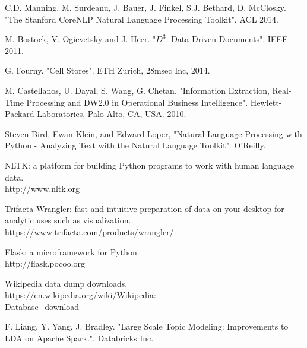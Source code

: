 \documentclass[10pt, a4paper, twocolumn]{article} %
\begin{document}
\begin{thebibliography}{99}
 C.D. Manning, M. Surdeanu, J. Bauer, J. Finkel, S.J. Bethard, D. McClosky. "The Stanford CoreNLP Natural Language Processing Toolkit". ACL 2014.

 M. Bostock, V. Ogievetsky and J. Heer. "$D^3$: Data-Driven Documents". IEEE 2011.

 G. Fourny. "Cell Stores". ETH Zurich, 28msec Inc, 2014.

 M. Castellanos, U. Dayal, S. Wang, G. Chetan. "Information Extraction, Real-Time Processing and DW2.0 in Operational Business Intelligence". Hewlett-Packard Laboratories, Palo Alto, CA, USA. 2010.

Steven Bird, Ewan Klein, and Edward Loper, 
"Natural Language Processing with Python - Analyzing Text with the Natural Language Toolkit". O'Reilly.

 NLTK: a platform for building Python programs to work with human language data. \\
http://www.nltk.org

 Trifacta Wrangler: fast and intuitive preparation of data on your desktop for analytic uses such as visualization. \\
https://www.trifacta.com/products/wrangler/

 Flask: a microframework for Python. \\
http://flask.pocoo.org

 Wikipedia data dump downloads. \\
https://en.wikipedia.org/wiki/Wikipedia:\\Database\_download

 F. Liang, Y. Yang, J. Bradley. "Large Scale Topic Modeling: Improvements to LDA on Apache Spark.", Databricks Inc.

\end{thebibliography}


\end{document}
